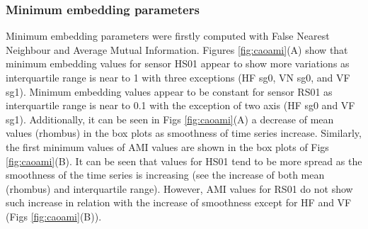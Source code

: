\documentclass[fleqn,10pt]{wlscirep}
\begin{document}
\subsubsection*{Minimum embedding parameters}
Minimum embedding parameters were firstly computed 
with False Nearest Neighbour and Average Mutual Information.
Figures \ref{fig:caoami}(A) show that minimum embedding values 
for sensor HS01 appear to show more variations as 
interquartile range is near to 1 
with three exceptions (HF sg0, VN sg0, and VF sg1).
Minimum embedding values appear to be constant for sensor RS01 
as interquartile range is near to 0.1 with the exception of 
two axis (HF sg0 and VF sg1).
Additionally, it can be seen in Figs \ref{fig:caoami}(A) a 
decrease of mean values (rhombus) in the box plots
as smoothness of time series increase.
Similarly, the first minimum values of AMI values are 
shown in the box plots of Figs \ref{fig:caoami}(B).
It can be seen that values for HS01 tend to be more spread as the smoothness 
of the time series is increasing 
(see the increase of both mean (rhombus) and interquartile range).
However, AMI values for RS01 do not show such increase in relation with
the increase of smoothness except for HF and VF
(Figs \ref{fig:caoami}(B)).
\end{document}
